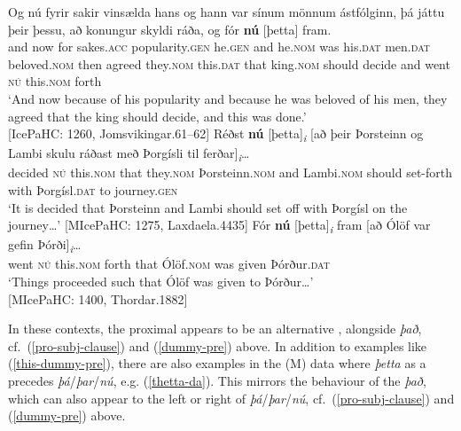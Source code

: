 \documentclass[output=paper,colorlinks,citecolor=brown]{langscibook}
\begin{document}
\ea \label{this-dummy-pre}
\ea  \label{happen-dem}
        \gll Og nú fyrir sakir vinsælda hans og hann var sínum mönnum ástfólginn, þá játtu þeir þessu, að konungur skyldi ráða, og fór \textbf{nú} [þetta] fram.\\
        and now for sakes.\textsc{acc} popularity.\textsc{gen} he.\textsc{gen} and he.\textsc{nom} was his.\textsc{dat} men.\textsc{dat} beloved.\textsc{nom} then agreed they.\textsc{nom} this.\textsc{dat} that king.\textsc{nom} should decide and went \textsc{nú} this.\textsc{nom} forth\\
        \glt `And now because of his popularity and because he was beloved of his men, they agreed that the king should decide, and this was done.'\\ \hfill [IcePaHC: 1260, Jomsvikingar.61--62]
\ex \label{dem-clause1}
        \gll Réðst \textbf{nú} [þetta]\textsubscript{\textit{i}} [að þeir Þorsteinn og Lambi skulu ráðast með Þorgísli til ferðar]\textsubscript{\textit{i}}\dots\\
        decided \textsc{nú} this.\textsc{nom} that they.\textsc{nom} Þorsteinn.\textsc{nom} and Lambi.\textsc{nom} should set-forth with Þorgísl.\textsc{dat} to journey.\textsc{gen}\\
        \glt `It is decided that Þorsteinn and Lambi should set off with Þorgísl on the journey\dots' \hfill [MIcePaHC: 1275, Laxdaela.4435]
\ex \label{dem-clause2} 
        \gll Fór \textbf{nú} [þetta]\textsubscript{\textit{i}} fram [að Ólöf var gefin Þórði]\textsubscript{\textit{i}}\dots \\ 
        went \textsc{nú} this.\textsc{nom} forth that Ólöf.\textsc{nom} was given Þórður.\textsc{dat}\\
        \glt `Things proceeded such that Ólöf was given to Þórður\dots'\\ \hfill [MIcePaHC: 1400, Thordar.1882]
\z 
\z 

\noindent In these contexts, the proximal  appears to be an alternative , alongside \textit{það}, cf.~(\ref{pro-subj-clause}) and (\ref{dummy-pre}) above. In addition to examples like (\ref{this-dummy-pre}), there are also examples in the (M) data where \textit{þetta} as a  precedes \textit{þá}/\textit{þar}/\textit{nú}, e.g. (\ref{thetta-da}). This mirrors the behaviour of the  \textit{það}, which can also appear to the left or right of \textit{þá}/\textit{þar}/\textit{nú}, cf.~(\ref{pro-subj-clause}) and (\ref{dummy-pre}) above. 
\end{document}
